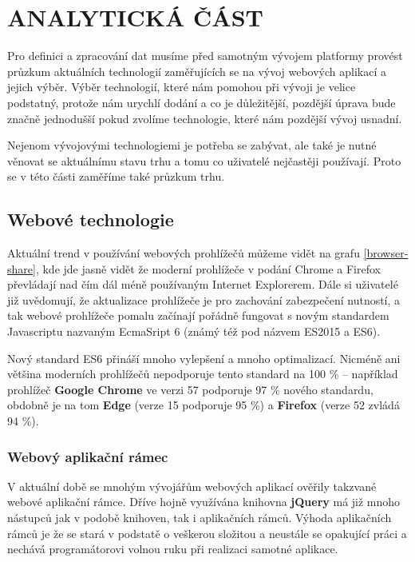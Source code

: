 \chapter{ANALYTICKÁ ČÁST} \label{analyza}
\par Pro definici a zpracování dat musíme před samotným vývojem platformy provést průzkum aktuálních technologií zaměřujících se na vývoj webových aplikací a jejich výběr. Výběr technologií, které nám pomohou při vývoji je velice podstatný, protože nám urychlí dodání a co je důležitější, pozdější úprava bude značně jednodušší pokud zvolíme technologie, které nám pozdější vývoj usnadní.

\par Nejenom vývojovými technologiemi je potřeba se zabývat, ale také je nutné věnovat se aktuálnímu stavu trhu a tomu co uživatelé nejčastěji používají. Proto se v této části zaměříme také průzkum trhu.

\section{Webové technologie}
\par Aktuální trend v používání webových prohlížečů můžeme vidět na grafu \ref{browser-share}, kde jde jasně vidět že moderní prohlížeče v podání Chrome a Firefox převládají nad čím dál méně používaným Internet Explorerem. Dále si uživatelé již uvědomují, že aktualizace prohlížeče je pro zachování zabezpečení nutností, a tak webové prohlížeče pomalu začínají pořádně fungovat s novým standardem Javascriptu nazvaným EcmaSript 6 (známý též pod názvem ES2015 a ES6). \cite{es6}

\par Nový standard ES6 přináší mnoho vylepšení a mnoho optimalizací. Nicméně ani většina moderních prohlížečů nepodporuje tento standard na 100 \% -- například prohlížeč \textbf{Google Chrome} ve verzi 57 podporuje 97 \% nového standardu, obdobně je na tom \textbf{Edge} (verze 15 podporuje 95 \%) a \textbf{Firefox} (verze 52 zvládá 94 \%). \cite{es6-coverage}

\subsection{Webový aplikační rámec}
\par V aktuální době se mnohým vývojářům webových aplikací ověřily takzvané webové aplikační rámce. Dříve hojně využívána knihovna \textbf{jQuery} má již mnoho nástupců jak v podobě knihoven, tak i aplikačních rámců. Výhoda aplikačních rámců je že se stará v podstatě o veškerou složitou a neustále se opakující práci a nechává programátorovi volnou ruku při realizaci samotné aplikace. \cite{framework}

